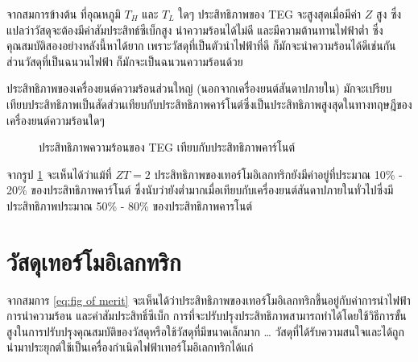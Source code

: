 \documentclass[a4paper,nobib,openany,10pt]{tufte-book}
\begin{document}
จากสมการข้างต้น ที่อุณหภูมิ \(T_H\) และ \(T_L\) ใดๆ ประสิทธิภาพของ TEG
จะสูงสุดเมื่อมีค่า \(Z\) สูง
ซึ่งแปลว่าวัสดุจะต้องมีค่าสัมประสิทธ์ซีเบ็กสูง นำความร้อนได้ไม่ดี
และมีความต้านทานไฟฟ้าต่ำ ซึ่งคุณสมบัติสองอย่างหลังนี้หาได้ยาก
เพราะวัสดุที่เป็นตัวนำไฟฟ้าที่ดี ก็มักจะนำความร้อนได้ดีเช่นกัน
ส่วนวัสดุที่เป็นฉนวนไฟฟ้า ก็มักจะเป็นฉนวนความร้อนด้วย

ประสิทธิภาพของเครื่องยนต์ความร้อนส่วนใหญ่ (นอกจากเครื่องยนต์สันดาปภายใน)
มักจะเปรียบเทียบประสิทธิภาพเป็นสัดส่วนเทียบกับประสิทธิภาพคาร์โนต์ซึ่งเป็นประสิทธิภาพสูงสุดในทางทฤษฎีของเครื่องยนต์ความร้อนใดๆ

\begin{figure}[h]
  \centering
\caption{\label{fig:teg vs carnot efficiency}ประสิทธิภาพความร้อนของ TEG เทียบกับประสิทธิภาพคาร์โนต์}
\end{figure}

จากรูป \ref{fig:teg vs carnot efficiency} จะเห็นได้ว่าแม้ที่ \(ZT = 2\) ประสิทธิภาพของเทอร์โมอิเลกทริกยังมีค่าอยู่ที่ประมาณ 10\% - 20\% ของประสิทธิภาพคาร์โนต์ ซึ่งนับว่ายังต่ำมากเมื่อเทียบกับเครื่องยนต์สันดาปภายในทั่วไปซึ่งมีประสิทธิภาพประมาณ 50\% - 80\% ของประสิทธิภาพคารโนต์

\section{วัสดุเทอร์โมอิเลกทริก}
\label{sec:org4fdb9d0}
จากสมการ \ref{eq:fig of merit}
จะเห็นได้ว่าประสิทธิภาพของเทอร์โมอิเลกทริกขึ้นอยู่กับค่าการนำไฟฟ้า
การนำความร้อน และค่าสัมประสิทธิ์ซีเบ็ก
การที่จะปรับปรุงประสิทธิภาพสามารถทำได้โดยใช้วิธีการขั้นสูงในการปรับปรุงคุณสมบัติของวัสดุหรือใช้วัสดุที่มีขนาดเล็กมาก
\ldots{}
วัสดุที่ได้รับความสนใจและได้ถูกนำมาประยุกต์ใช้เป็นเครื่องกำเนิดไฟฟ้าเทอร์โมอิเลกทริกได้แก่
\end{document}
